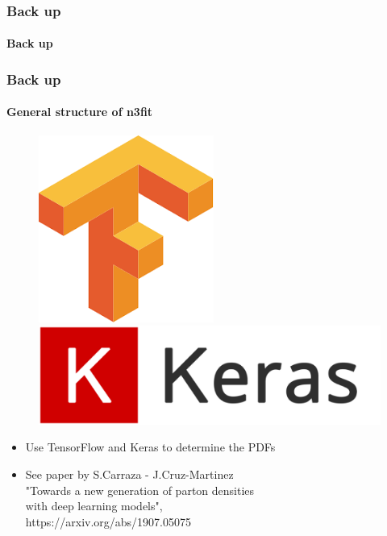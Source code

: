 \documentclass[aspectratio=43]{beamer}
\begin{document}
\begin{frame}

	\frametitle{Back up}
	\framesubtitle{Back up}
	
\end{frame}

\begin{frame}

	\frametitle{Back up}
	\framesubtitle{General structure of n3fit}
	
	\footnotesize
	
	\begin{figure}[!htb]
		\includegraphics[width = 0.5\linewidth]{plots/backup/TF.png}
		\endminipage\hfill
		\includegraphics[width = 0.5\linewidth]{plots/backup/Keras.png}
		\endminipage\hfill
	\end{figure}
	
	\begin{itemize}
		\item Use TensorFlow and Keras to determine the PDFs
		\item See paper by S.Carraza - J.Cruz-Martinez \\
		{\color{blue}"Towards a new generation of parton densities\\ with deep learning models",\\ https://arxiv.org/abs/1907.05075}
	\end{itemize}

\end{frame}
\end{document}
